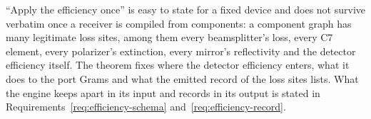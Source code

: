 
``Apply the efficiency once'' is easy to state for a fixed device and does not
survive verbatim once a receiver is compiled from components: a component graph
has many legitimate loss sites, among them every beamsplitter's loss, every C7
element, every polarizer's extinction, every mirror's reflectivity and the
detector efficiency itself. The theorem fixes where the detector efficiency
enters, what it does to the port Grams and what the emitted record of the loss
sites lists. What the engine keeps apart in its input and records in its output
is stated in Requirements~\ref{req:efficiency-schema}
and~\ref{req:efficiency-record}.

